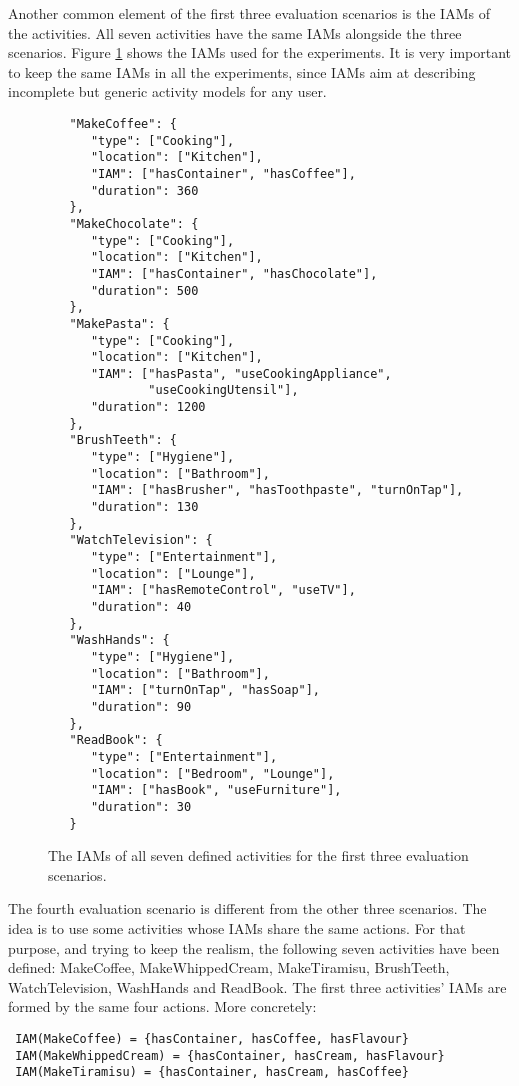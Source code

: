 Another common element of the first three evaluation scenarios is the IAMs of the activities. All seven activities have the same IAMs alongside the three scenarios. Figure \ref{fig:basic-iams} shows the IAMs used for the experiments. It is very important to keep the same IAMs in all the experiments, since IAMs aim at describing incomplete but generic activity models for any user.

\begin{figure}
\begin{small}
\lstset{linewidth=\textwidth}
\begin{lstlisting}
   "MakeCoffee": {
      "type": ["Cooking"],
      "location": ["Kitchen"],
      "IAM": ["hasContainer", "hasCoffee"],
      "duration": 360
   },
   "MakeChocolate": {
      "type": ["Cooking"],
      "location": ["Kitchen"],
      "IAM": ["hasContainer", "hasChocolate"],
      "duration": 500
   },
   "MakePasta": {
      "type": ["Cooking"],
      "location": ["Kitchen"],
      "IAM": ["hasPasta", "useCookingAppliance", 
              "useCookingUtensil"],
      "duration": 1200
   },
   "BrushTeeth": {
      "type": ["Hygiene"],
      "location": ["Bathroom"],
      "IAM": ["hasBrusher", "hasToothpaste", "turnOnTap"],
      "duration": 130
   },
   "WatchTelevision": {
      "type": ["Entertainment"],
      "location": ["Lounge"],
      "IAM": ["hasRemoteControl", "useTV"],
      "duration": 40
   },
   "WashHands": {
      "type": ["Hygiene"],
      "location": ["Bathroom"],
      "IAM": ["turnOnTap", "hasSoap"],
      "duration": 90
   },
   "ReadBook": {
      "type": ["Entertainment"],
      "location": ["Bedroom", "Lounge"],
      "IAM": ["hasBook", "useFurniture"],
      "duration": 30
   } 
\end{lstlisting}
\end{small}
\caption{The IAMs of all seven defined activities for the first three evaluation scenarios.}
\label{fig:basic-iams}
\end{figure}

The fourth evaluation scenario is different from the other three scenarios. The idea is to use some activities whose IAMs share the same actions. For that purpose, and trying to keep the realism, the following seven activities have been defined: MakeCoffee, MakeWhippedCream, MakeTiramisu, BrushTeeth, WatchTelevision, WashHands and ReadBook. The first three activities' IAMs are formed by the same four actions. More concretely:

\begin{small}
\lstset{linewidth=\textwidth}
\begin{lstlisting}
 IAM(MakeCoffee) = {hasContainer, hasCoffee, hasFlavour}
 IAM(MakeWhippedCream) = {hasContainer, hasCream, hasFlavour}
 IAM(MakeTiramisu) = {hasContainer, hasCream, hasCoffee} 
\end{lstlisting}
\end{small}

